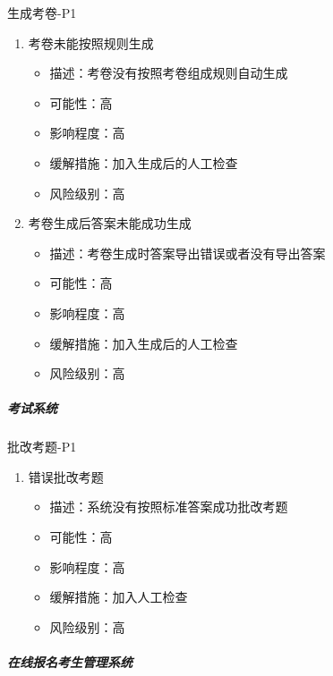 \documentclass[hyperref, a4paper]{ctexart}
\providecommand{\tightlist}{%
  \setlength{\itemsep}{0pt}\setlength{\parskip}{0pt}}
\let\oldsubparagraph\subparagraph
\renewcommand{\subparagraph}[1]{\oldsubparagraph{#1}\mbox{}}
\begin{document}
生成考卷-P1

\begin{enumerate}
\def\labelenumi{\arabic{enumi}.}
\tightlist
\item
  考卷未能按照规则生成

  \begin{itemize}
  \tightlist
  \item
    描述：考卷没有按照考卷组成规则自动生成
  \item
    可能性：高
  \item
    影响程度：高
  \item
    缓解措施：加入生成后的人工检查
  \item
    风险级别：高
  \end{itemize}
\item
  考卷生成后答案未能成功生成

  \begin{itemize}
  \tightlist
  \item
    描述：考卷生成时答案导出错误或者没有导出答案
  \item
    可能性：高
  \item
    影响程度：高
  \item
    缓解措施：加入生成后的人工检查
  \item
    风险级别：高
  \end{itemize}
\end{enumerate}

\hypertarget{ux8003ux8bd5ux7cfbux7edf-3}{%
\subparagraph{考试系统}\label{ux8003ux8bd5ux7cfbux7edf-3}}

批改考题-P1

\begin{enumerate}
\def\labelenumi{\arabic{enumi}.}
\tightlist
\item
  错误批改考题

  \begin{itemize}
  \tightlist
  \item
    描述：系统没有按照标准答案成功批改考题
  \item
    可能性：高
  \item
    影响程度：高
  \item
    缓解措施：加入人工检查
  \item
    风险级别：高
  \end{itemize}
\end{enumerate}

\hypertarget{ux5728ux7ebfux62a5ux540dux8003ux751fux7ba1ux7406ux7cfbux7edf}{%
\subparagraph{在线报名考生管理系统}\label{ux5728ux7ebfux62a5ux540dux8003ux751fux7ba1ux7406ux7cfbux7edf}}
\end{document}

